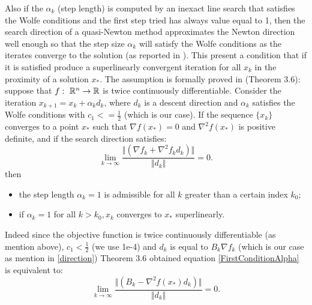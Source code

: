 Also if the $\alpha_{k}$ (step length) is computed by an inexact line search that satisfies the Wolfe conditions and the first step tried has always value equal to 1, then the search direction of a quasi-Newton method approximates the Newton direction well enough so that the step size $\alpha_{k}$ will satisfy the Wolfe conditions as the iterates converge to the solution (as reported in \cite{numerical}). This present a condition that if it is satisfied produce a superlinearly convergent iteration for all $x_{k}$ in the proximity of a solution $x_{*}$. The assumption is formally proved in \cite{numerical} (Theorem 3.6): suppose that $f: \textnormal{ }\mathbb{R}^n \rightarrow \mathbb{R}$ is twice continuously differentiable. Consider the iteration $x_{k+1} = x_{k} + \alpha_{k}d_{k}$, where $d_{k}$ is a descent direction and $\alpha_{k}$ satisfies the Wolfe conditions with $c_{1} <= \frac{1}{2}$ (which is our case). If the sequence $\{ x_{k} \}$ converges to a point $x_{*}$ such that $\nabla f(x_{*}) = 0$ and $\nabla^2f(x_{*})$ is positive definite, and if the search direction satisfies: 
\begin{equation}
\label{FirstConditionAlpha}
 \lim_{k\to\infty}\frac{\Vert (\nabla f_{k} + \nabla^2 f_{k} d_{k})\Vert}{\Vert d_{k} \Vert} = 0.
\end{equation} 
then 
\begin{itemize}
	\item the step length $\alpha_{k} = 1$ is admissible for all $k$ greater than a certain index $k_{0}$;
	\item if $\alpha_{k} = 1$ for all $k>k_{0}, x_{k}$ converges to $x_{*}$ superlinearly.
\end{itemize}

 Indeed since the objective function is twice continuously differentiable (as mention above), $c_{1}<\frac{1}{2}$ (we use 1e-4) and $d_{k}$ is equal to $B_{k}\nabla f_{k}$ (which is our case as mention in \ref{direction}) Theorem 3.6 obtained equation \ref{FirstConditionAlpha} is equivalent to: 
\begin{equation}
\label{SecondConditionAlpha}
 \lim_{k\to\infty}\frac{\Vert (B_{k} - \nabla^2f(x_*) d_{k})\Vert}{\Vert d_{k} \Vert} = 0.
\end{equation}

